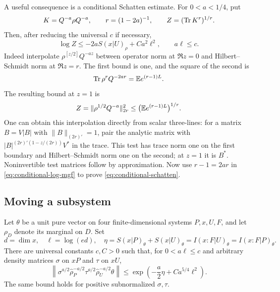A useful consequence is a conditional Schatten estimate.  For
$0<a<1/4$, put
\[
 K=Q^{-a}\rho Q^{-a},\qquad
 r=(1-2a)^{-1},\qquad Z=(\operatorname{Tr} K^r)^{1/r}.
\]
Then, after reducing the universal $c$ if necessary,
\begin{equation}\label{eq:conditional-schatten}
 \log Z\le-2aS(x|U)_\rho+C a^2\ell^2,
 \qquad a\ell\le c.
\end{equation}
Indeed interpolate $\rho^{[z/2]}Q^{-az}$ between operator norm at
$\Re z=0$ and Hilbert--Schmidt norm at $\Re z=r$.  The first bound is
one, and the square of the second is
\[
 \operatorname{Tr}\rho^rQ^{-2ar}=\mathbb E e^{(r-1)L}.
\]
The resulting bound at $z=1$ is
\[
 Z=\|\rho^{1/2}Q^{-a}\|_{2r}^2
 \le\big(\mathbb E e^{(r-1)L}\big)^{1/r}.
\]
One can obtain this interpolation directly from scalar three-lines:
for a matrix $B=V|B|$ with $\|B\|_{(2r)'}=1$, pair the analytic
matrix with
$|B|^{(2r)'(1-z/(2r))}V^*$ in the trace.  This test has trace norm
one on the first boundary and Hilbert--Schmidt norm one on the second;
at $z=1$ it is $B^*$.  Noninvertible test matrices follow by
approximation.  Now use $r-1=2ar$ in
\eqref{eq:conditional-log-mgf} to prove
\eqref{eq:conditional-schatten}.

\subsection{Moving a subsystem}

\begin{lemma}\label{lem:movement}
Let $\theta$ be a unit pure vector on four finite-dimensional systems
$P,x,U,F$, and let $\rho_D$ denote its marginal on $D$.  Set
\[
 d=\dim x,\quad \ell=\log(ed),\quad
 \eta=S(x|P)_\theta+S(x|U)_\theta
      =I(x:F|U)_\theta=I(x:F|P)_\theta.
\]
There are universal constants $c,C>0$ such that, for
$0<a\ell\le c$ and arbitrary density matrices $\sigma$ on $xP$
and $\tau$ on $xU$,
\begin{equation}\label{eq:conditional-movement}
 \left\|\sigma^{a/2}\widehat\rho_P^{-a/2}
          \tau^{a/2}\widehat\rho_U^{-a/2}\theta\right\|
 \le\exp\left(-\frac a2\eta+C a^{5/4}\ell^2\right).
\end{equation}
The same bound holds for positive subnormalized $\sigma,\tau$.
\end{lemma}


